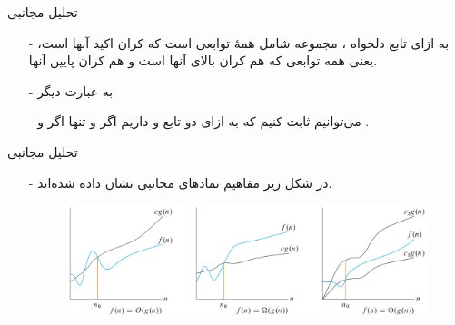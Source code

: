 \begin{frame}{‌تحلیل مجانبی}
\begin{itemize}\itemr
\item[-]
به ازای تابع دلخواه
، مجموعه
شامل همهٔ توابعی است که کران اکید آنها
است، یعنی همه توابعی که
هم کران بالای آنها است و هم کران پایین آنها.
\item[-]
به عبارت دیگر
\begin{flushleft}
\end{flushleft}
\item[-]
می‌توانیم ثابت کنیم که به ازای دو تابع
و
داریم
اگر و تنها اگر
و
.
\end{itemize}
\end{frame}

\begin{frame}{‌تحلیل مجانبی}
\begin{itemize}\itemr
\item[-]
در شکل زیر مفاهیم نمادهای مجانبی نشان داده شده‌اند.
\begin{figure}
\includegraphics[width=1\textwidth]{figs/chap02/asymptotic}
\end{figure}
\end{itemize}
\end{frame}


